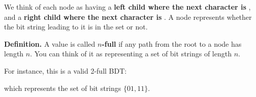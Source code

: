 We think of each  node as having a \textbf{left child where the next character
is }, and a \textbf{right child where the next character is }. A
 node represents whether the bit string leading to it is
in the set or not.

\textbf{Definition.} A value  is called \textbf{$n$-full} if
any path from the root to a  node has length $n$. You can think of
it as representing a set of bit strings of length $n$.

For instance, this is a valid 2-full BDT:

\begin{center}
\end{center}

which represents the set of bit strings $\{ 01, 11 \}$.

\newpage

